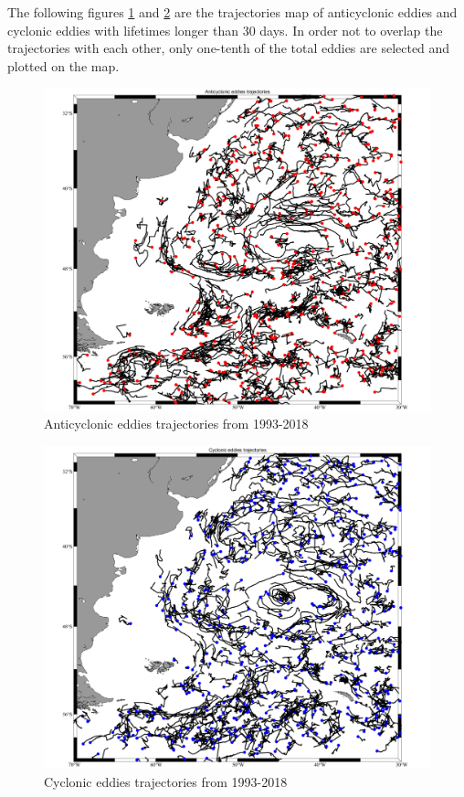 The following figures \ref{Anticyclonic eddies trajectories} and \ref{10 Cyclonic eddies trajectories} are the trajectories map of anticyclonic eddies and cyclonic eddies with lifetimes longer than 30 days. In order not to overlap the trajectories with each other, only one-tenth of the total eddies are selected and plotted on the map.


\begin{figure}[ht]
  \centering
  \setlength{\abovecaptionskip}{0.cm}
  \includegraphics[width=1.0\textwidth]{chapter/figure/10 Anticyclonic eddies trajectories.png}
  \caption
  {Anticyclonic eddies trajectories from 1993-2018}
  \label{Anticyclonic eddies trajectories}
\end{figure}

\begin{figure}[ht]
  \centering
  \setlength{\abovecaptionskip}{0.cm}
  \includegraphics[width=1.0\textwidth]{chapter/figure/10 Cyclonic eddies trajectories.png}
  \caption
  {Cyclonic eddies trajectories from 1993-2018}
  \label{10 Cyclonic eddies trajectories}
\end{figure}


